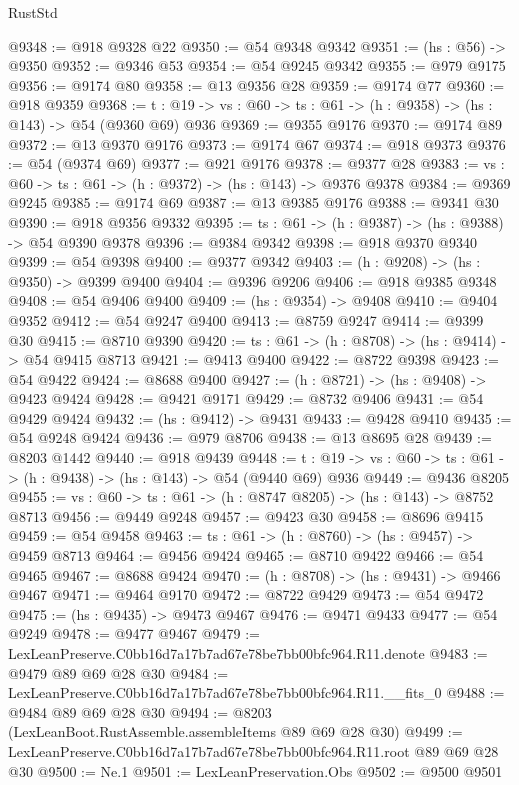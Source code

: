 \begin{lexlean}{RustStd}
\begin{coremodule}
@9348 := @918 @9328 @22
@9350 := @54 @9348 @9342
@9351 := (hs : @56) -> @9350
@9352 := @9346 @53
@9354 := @54 @9245 @9342
@9355 := @979 @9175
@9356 := @9174 @80
@9358 := @13 @9356 @28
@9359 := @9174 @77
@9360 := @918 @9359
@9368 := {t : @19} -> {vs : @60} -> {ts : @61} -> (h : @9358) -> (hs : @143) -> @54 (@9360 @69) @936
@9369 := @9355 @9176
@9370 := @9174 @89
@9372 := @13 @9370 @9176
@9373 := @9174 @67
@9374 := @918 @9373
@9376 := @54 (@9374 @69)
@9377 := @921 @9176
@9378 := @9377 @28
@9383 := {vs : @60} -> {ts : @61} -> (h : @9372) -> (hs : @143) -> @9376 @9378
@9384 := @9369 @9245
@9385 := @9174 @69
@9387 := @13 @9385 @9176
@9388 := @9341 @30
@9390 := @918 @9356 @9332
@9395 := {ts : @61} -> (h : @9387) -> (hs : @9388) -> @54 @9390 @9378
@9396 := @9384 @9342
@9398 := @918 @9370 @9340
@9399 := @54 @9398
@9400 := @9377 @9342
@9403 := (h : @9208) -> (hs : @9350) -> @9399 @9400
@9404 := @9396 @9206
@9406 := @918 @9385 @9348
@9408 := @54 @9406 @9400
@9409 := (hs : @9354) -> @9408
@9410 := @9404 @9352
@9412 := @54 @9247 @9400
@9413 := @8759 @9247
@9414 := @9399 @30
@9415 := @8710 @9390
@9420 := {ts : @61} -> (h : @8708) -> (hs : @9414) -> @54 @9415 @8713
@9421 := @9413 @9400
@9422 := @8722 @9398
@9423 := @54 @9422
@9424 := @8688 @9400
@9427 := (h : @8721) -> (hs : @9408) -> @9423 @9424
@9428 := @9421 @9171
@9429 := @8732 @9406
@9431 := @54 @9429 @9424
@9432 := (hs : @9412) -> @9431
@9433 := @9428 @9410
@9435 := @54 @9248 @9424
@9436 := @979 @8706
@9438 := @13 @8695 @28
@9439 := @8203 @1442
@9440 := @918 @9439
@9448 := {t : @19} -> {vs : @60} -> {ts : @61} -> (h : @9438) -> (hs : @143) -> @54 (@9440 @69) @936
@9449 := @9436 @8205
@9455 := {vs : @60} -> {ts : @61} -> (h : @8747 @8205) -> (hs : @143) -> @8752 @8713
@9456 := @9449 @9248
@9457 := @9423 @30
@9458 := @8696 @9415
@9459 := @54 @9458
@9463 := {ts : @61} -> (h : @8760) -> (hs : @9457) -> @9459 @8713
@9464 := @9456 @9424
@9465 := @8710 @9422
@9466 := @54 @9465
@9467 := @8688 @9424
@9470 := (h : @8708) -> (hs : @9431) -> @9466 @9467
@9471 := @9464 @9170
@9472 := @8722 @9429
@9473 := @54 @9472
@9475 := (hs : @9435) -> @9473 @9467
@9476 := @9471 @9433
@9477 := @54 @9249
@9478 := @9477 @9467
@9479 := LexLeanPreserve.C0bb16d7a17b7ad67e78be7bb00bfc964.R11.denote
@9483 := @9479 @89 @69 @28 @30
@9484 := LexLeanPreserve.C0bb16d7a17b7ad67e78be7bb00bfc964.R11.__fits_0
@9488 := @9484 @89 @69 @28 @30
@9494 := @8203 (LexLeanBoot.RustAssemble.assembleItems @89 @69 @28 @30)
@9499 := LexLeanPreserve.C0bb16d7a17b7ad67e78be7bb00bfc964.R11.root @89 @69 @28 @30
@9500 := Ne.{1}
@9501 := LexLeanPreservation.Obs
@9502 := @9500 @9501

\end{coremodule}
\end{lexlean}
